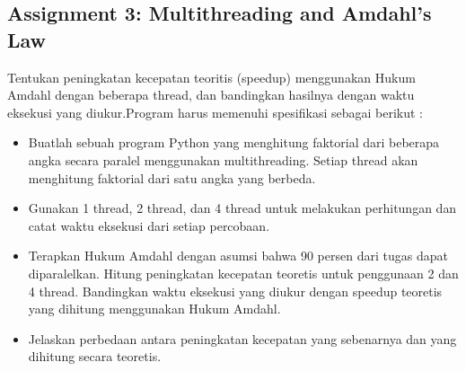 \documentclass[12pt]{article}
\begin{document}
	\subsection{Assignment 3: Multithreading and Amdahl's Law}
	Tentukan peningkatan kecepatan teoritis (speedup) menggunakan Hukum Amdahl dengan beberapa thread, dan bandingkan hasilnya dengan waktu eksekusi yang diukur.Program harus memenuhi spesifikasi sebagai berikut :
	\begin{itemize}
		\item Buatlah sebuah program Python yang menghitung faktorial dari beberapa angka secara paralel menggunakan multithreading. Setiap thread akan menghitung faktorial dari satu angka yang berbeda.
		\item Gunakan 1 thread, 2 thread, dan 4 thread untuk melakukan perhitungan dan catat waktu eksekusi dari setiap percobaan.
		\item Terapkan Hukum Amdahl dengan asumsi bahwa 90 persen dari tugas dapat diparalelkan. Hitung peningkatan kecepatan teoretis untuk penggunaan 2 dan 4 thread.
		Bandingkan waktu eksekusi yang diukur dengan speedup teoretis yang dihitung menggunakan Hukum Amdahl.
		
		\item Jelaskan perbedaan antara peningkatan kecepatan yang sebenarnya dan yang dihitung secara teoretis.
	\end{itemize}
\end{document}
